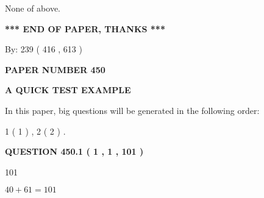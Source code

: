 \documentclass[12pt]{article}
\begin{document}
 
 None of above.
 
 
 
 
   
   
 \vspace{0.2in}
 
   
   
   
   
\vspace{1.0in} 
{\textbf{\large{ *** END OF PAPER, THANKS *** }}} 
   
   
\hspace{1.0in} By: 
 239 ( 416 ,  613 )
   
   
   
   
\newpage 
\setcounter{page}{ 
   450001 } 
   
   
   
   
 {\textbf{ \Large{ PAPER NUMBER  450  }}}
   
   
\vspace{0.2in}
   
   
   
   
   
   
 \vspace{0.2in}
{\LARGE {\textbf{ A QUICK TEST EXAMPLE}}}
   
   
   
\vspace{0.2in}
   
In this paper, big questions will be generated in the following order: 
   
   
   1 ( 1 )
 ,
   2 ( 2 )
 .
  
\vspace{0.2in}
  
{\textbf{\Large{QUESTION
450.1 
 ( 1 , 1 , 101 )
}}}
  
  
 
 
\noindent{}

101
 
 
 
 
\noindent{}

$ %
40 +  %
61=   %
101$
 
 
  
\vspace{0.2in}
  
\end{document}
